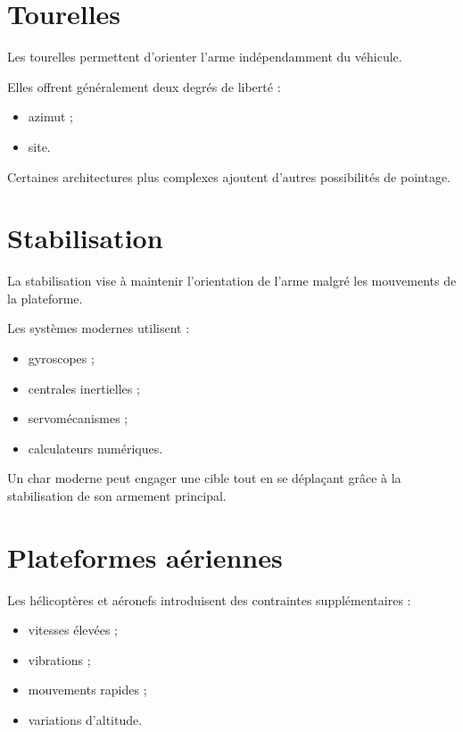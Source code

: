 \section{Tourelles}

Les tourelles permettent d'orienter l'arme indépendamment du véhicule.

Elles offrent généralement deux degrés de liberté :

\begin{itemize}
    \item azimut ;
    \item site.
\end{itemize}

Certaines architectures plus complexes ajoutent d'autres possibilités de
pointage.

\section{Stabilisation}

La stabilisation vise à maintenir l'orientation de l'arme malgré les
mouvements de la plateforme.

Les systèmes modernes utilisent :

\begin{itemize}
    \item gyroscopes ;
    \item centrales inertielles ;
    \item servomécanismes ;
    \item calculateurs numériques.
\end{itemize}

\begin{exemple}

Un char moderne peut engager une cible tout en se déplaçant grâce à la
stabilisation de son armement principal.

\end{exemple}

\section{Plateformes aériennes}

Les hélicoptères et aéronefs introduisent des contraintes supplémentaires :

\begin{itemize}
    \item vitesses élevées ;
    \item vibrations ;
    \item mouvements rapides ;
    \item variations d'altitude.
\end{itemize}

